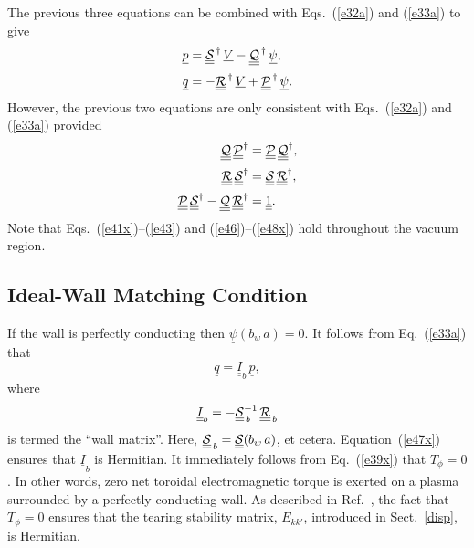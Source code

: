 \documentclass[12pt,prb,aps]{revtex4-1}
\begin{document}
The previous three equations can be combined with Eqs.~(\ref{e32a}) and (\ref{e33a}) to give 
\begin{align}
\underline{p} &= \underline{\underline{\cal S}}^{\,\dag} \,\underline{V} - \underline{\underline{\cal Q}}^{\,\dag}\,\underline{\psi},\\[0.5ex]
\underline{q} &= -\underline{\underline{\cal R}}^{\,\dag} \,\underline{V} + \underline{\underline{\cal P}}^{\,\dag}\,\underline{\psi}.
\end{align}
However, the previous two equations are only consistent with Eqs.~(\ref{e32a}) and (\ref{e33a}) provided 
\begin{align}\label{e46}
\underline{\underline{\cal Q}}\,\underline{\underline{\cal P}}^\dag&= \underline{\underline{\cal P}}\,\underline{\underline{\cal Q}}^\dag,\\[0.5ex]
\underline{\underline{\cal R}}\,\underline{\underline{\cal S}}^\dag&= \underline{\underline{\cal S}}\,\underline{\underline{\cal R}}^\dag,\label{e47x}\\[0.5ex]
\underline{\underline{\cal P}}\,\underline{\underline{\cal S}}^{\dag}- \underline{\underline{\cal Q}}\,\underline{\underline{\cal R}}^{\dag}&=\underline{\underline{1}}.\label{e48x}
\end{align}
Note that Eqs.~(\ref{e41x})--(\ref{e43}) and (\ref{e46})--(\ref{e48x}) hold throughout the vacuum region. 

\subsection{Ideal-Wall Matching Condition}
If the wall is perfectly conducting then  $\underline{\psi}(b_w\,a)=0$. 
It follows from Eq.~(\ref{e33a}) that
\begin{equation}
\underline{q} = \underline{\underline{I}}_b\,\underline{p},
\end{equation}
where
\begin{equation}
 \underline{\underline{I}}_b=- \underline{\underline{\cal S}}_{\,b}^{-1}\,\underline{\underline{\cal R}}_{\,b}
 \end{equation}
 is termed the ``wall matrix''.
 Here, $\underline{\underline{\cal S}}_{\,b}= \underline{\underline{\cal S}}(b_w\,a)$, et cetera. Equation~(\ref{e47x}) ensures that $ \underline{\underline{I}}_b$
 is Hermitian. It immediately follows from Eq.~(\ref{e39x}) that $T_\phi=0$. In other words, zero net toroidal electromagnetic torque is exerted on a plasma
 surrounded by a perfectly conducting wall. As described in Ref.~, the fact that $T_\phi=0$ ensures that the tearing stability matrix, $E_{kk'}$, introduced in
 Sect.~\ref{disp}, is Hermitian. 
 
\end{document}
